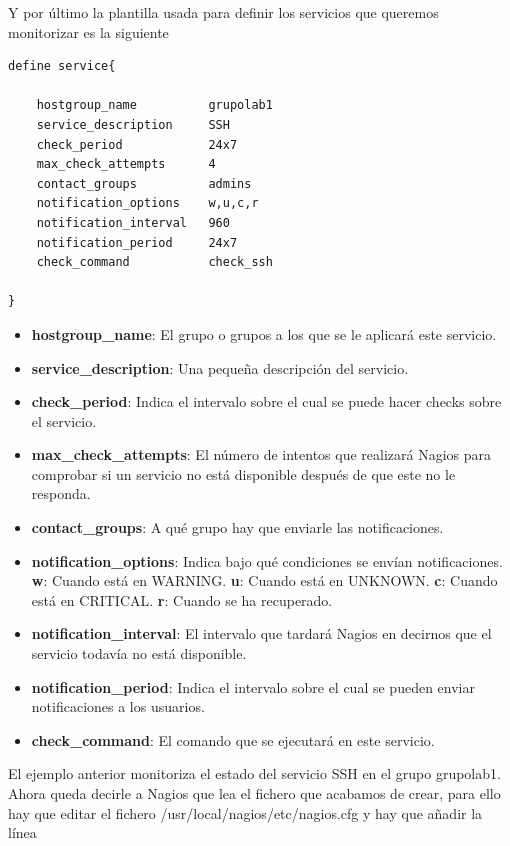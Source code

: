 \documentclass[11pt,a4paper]{article}
\begin{document}
Y por último la plantilla usada para definir los servicios que queremos monitorizar es la siguiente
\begin{verbatim}
define service{

    hostgroup_name          grupolab1
    service_description     SSH
    check_period            24x7
    max_check_attempts      4
    contact_groups          admins
    notification_options    w,u,c,r
    notification_interval   960
    notification_period     24x7
    check_command           check_ssh
    
}
\end{verbatim}

\begin{itemize}
\item \textbf{hostgroup\_name}: El grupo o grupos a los que se le aplicará este servicio.
\item \textbf{service\_description}: Una pequeña descripción del servicio.
\item \textbf{check\_period}: Indica el intervalo sobre el cual se puede hacer checks sobre el servicio.
\item \textbf{max\_check\_attempts}: El número de intentos que realizará Nagios para comprobar si un servicio no está disponible después de que este no le responda.
\item \textbf{contact\_groups}: A qué grupo hay que enviarle las notificaciones.
\item \textbf{notification\_options}: Indica bajo qué condiciones se envían notificaciones. \textbf{w}: Cuando está en WARNING. \textbf{u}: Cuando está en UNKNOWN. \textbf{c}: Cuando está en CRITICAL. \textbf{r}: Cuando se ha recuperado.
\item \textbf{notification\_interval}: El intervalo que tardará Nagios en decirnos que el servicio todavía no está disponible.
\item \textbf{notification\_period}: Indica el intervalo sobre el cual se pueden enviar notificaciones a los usuarios.
\item \textbf{check\_command}: El comando que se ejecutará en este servicio.
\end{itemize}

El ejemplo anterior monitoriza el estado del servicio SSH en el grupo grupolab1.
\\

Ahora queda decirle a Nagios que lea el fichero que acabamos de crear, para ello hay que editar el fichero /usr/local/nagios/etc/nagios.cfg y hay que añadir la línea
\end{document}
